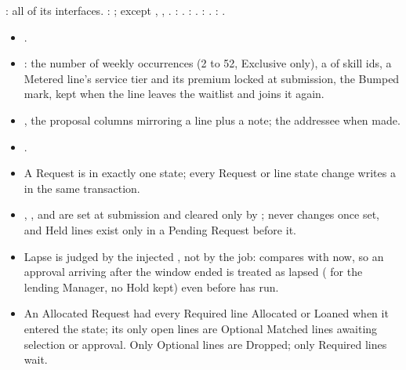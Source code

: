 : all of its interfaces. : ;  except , , . : . : . : . : .

{\raggedright
\begin{itemize}
\item {}.
\item {}:  the number of weekly occurrences (2 to 52, Exclusive only),  a  of skill ids,  a Metered line's service tier and  its premium locked at submission,  the Bumped mark, kept when the line leaves the waitlist and joins it again.
\item {}, the proposal columns mirroring a line plus a note;  the addressee when made.
\item {}.
\end{itemize}}
\begin{itemize}
\item A Request is in exactly one state; every Request or line state change writes a  in the same transaction.
\item {}, , and  are set at submission and cleared only by ;  never changes once set, and Held lines exist only in a Pending Request before it.
\item Lapse is judged by the injected , not by the job:  compares  with now, so an approval arriving after the window ended is treated as lapsed ( for the lending Manager, no Hold kept) even before  has run.
\item An Allocated Request had every Required line Allocated or Loaned when it entered the state; its only open lines are Optional Matched lines awaiting selection or approval. Only Optional lines are Dropped; only Required lines wait.
\end{itemize}

